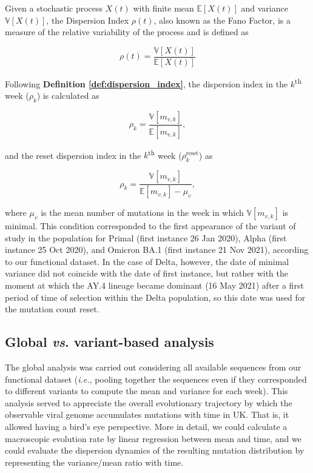 \begin{definition}\label{def:dispersion_index}
    Given a stochastic process \( X(t) \) with finite mean \( \mathbb{E}\left[X(t)\right] \) and variance \( \mathbb{V}\left[X(t)\right] \), the Dispersion Index \( \rho(t) \), also known as the Fano Factor, is a measure of the relative variability of the process and is defined as

    $$
    \rho(t) = \frac{\mathbb{V}\left[X(t)\right]}{\mathbb{E}\left[X(t)\right]}
    $$
\end{definition}

\noindent Following \textbf{Definition \ref{def:dispersion_index}}, the dispersion index in the $k$\textsuperscript{th} week ($\rho_k$) is calculated as

\begin{equation}
    \rho_k=\frac{\mathbb{V}\left[m_{v,k}\right]}{\mathbb{E}\left[m_{v,k}\right]},
\end{equation}

\noindent and the reset dispersion index in the $k$\textsuperscript{th} week ($\rho_k^\text{reset}$) as

\begin{equation}
    \rho_k=\frac{\mathbb{V}\left[m_{v,k}\right]}{\mathbb{E}\left[m_{v,k}\right] - \mu_v},
\end{equation}

\noindent where $\mu_v$ is the mean number of mutations in the week in which $\mathbb{V}\left[m_{v,k}\right]$ is minimal. This condition corresponded to the first appearance of the variant of study in the population for Primal (first instance 26 Jan 2020), Alpha (first instance 25 Oct 2020), and Omicron BA.1 (first instance 21 Nov 2021), according to our functional dataset. In the case of Delta, however, the date of minimal variance did not coincide with the date of first instance, but rather with the moment at which the AY.4 lineage became dominant (16 May 2021) after a first period of time of selection within the Delta population, so this date was used for the mutation count reset.

\subsection{Global \textit{vs}. variant-based analysis}

The global analysis was carried out considering all available sequences from our functional dataset (\textit{i.e.}, pooling together the sequences even if they corresponded to different variants to compute the mean and variance for each week). This analysis served to appreciate the overall evolutionary trajectory by which the observable viral genome accumulates mutations with time in UK. That is, it allowed having a bird's eye perspective. More in detail, we could calculate a macroscopic evolution rate by linear regression between mean and time, and we could evaluate the dispersion dynamics of the resulting mutation distribution by representing the variance/mean ratio with time.

